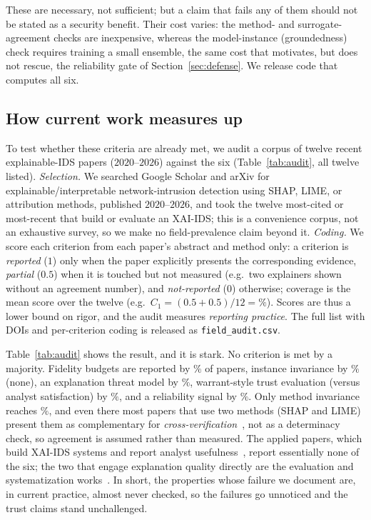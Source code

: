 \documentclass[conference]{IEEEtran}
\begin{document}
These are necessary, not sufficient; but a claim that fails any of them should not be stated as a
security benefit. Their cost varies: the method- and surrogate-agreement checks are inexpensive,
whereas the model-instance (groundedness) check requires training a small ensemble, the same cost
that motivates, but does not rescue, the reliability gate of Section~\ref{sec:defense}. We release
code that computes all six.

\subsection{How current work measures up}\label{sec:audit}
To test whether these criteria are already met, we audit a corpus of twelve recent
explainable-IDS papers ($2020$--$2026$) against the six (Table~\ref{tab:audit}, all twelve listed).
\emph{Selection.} We searched Google Scholar and arXiv for explainable/interpretable
network-intrusion detection using SHAP, LIME, or attribution methods, published $2020$--$2026$, and
took the twelve most-cited or most-recent that build or evaluate an XAI-IDS; this is a convenience
corpus, not an exhaustive survey, so we make no field-prevalence claim beyond it.
\emph{Coding.} We score each criterion from each paper's
abstract and method only: a criterion is \emph{reported} ($1$) only when the paper explicitly presents
the corresponding evidence, \emph{partial} ($0.5$) when it is touched but not measured (e.g.\ two
explainers shown without an agreement number), and \emph{not-reported} ($0$) otherwise; coverage is
the mean score over the twelve (e.g.\ $C_1{=}(0.5{+}0.5)/12{=}\%$). Scores are thus a lower bound on
rigor, and the audit measures \emph{reporting practice}. The full list with DOIs and per-criterion
coding is released as \texttt{field\_audit.csv}.

Table~\ref{tab:audit} shows the result, and it is stark. No criterion is met by a majority.
Fidelity budgets are reported by $\%$ of papers, instance invariance by
$\%$ (none), an explanation threat model by $\%$,
warrant-style trust evaluation (versus analyst satisfaction) by $\%$, and a
reliability signal by $\%$. Only method invariance reaches
$\%$, and even there most papers that use two methods (SHAP and LIME) present
them as complementary for \emph{cross-verification}~\cite{lxaids2025}, not as a determinacy check,
so agreement is assumed rather than measured. The applied papers, which build XAI-IDS systems and
report analyst usefulness~\cite{xgnid2024,feat5g2025}, report essentially none of the six; the two
that engage explanation quality directly are the evaluation and systematization
works~\cite{warnecke2020evaluating,nadeem2023sok}. In short, the properties whose failure we document are, in
current practice, almost never checked, so the failures go unnoticed and the
trust claims stand unchallenged.
\end{document}
